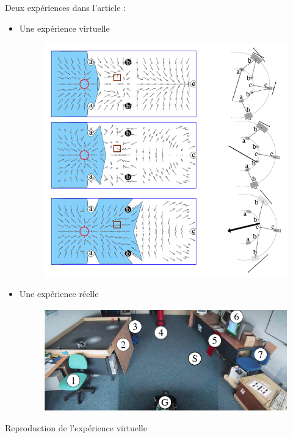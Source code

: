 \documentclass{beamer}
\begin{document}
\begin{frame}
  Deux expériences dans l'article :
  \begin{itemize}
    \item Une expérience virtuelle
    \begin{figure}
      \centering
      \includegraphics[scale=0.2]{Exp-virtuel.png}
    \end{figure}
    \item Une expérience réelle
    \begin{figure}
      \centering
      \includegraphics[scale=0.2]{Exp-real.png}
    \end{figure}
  \end{itemize}
  Reproduction de l'expérience virtuelle
\end{frame}
\end{document}
